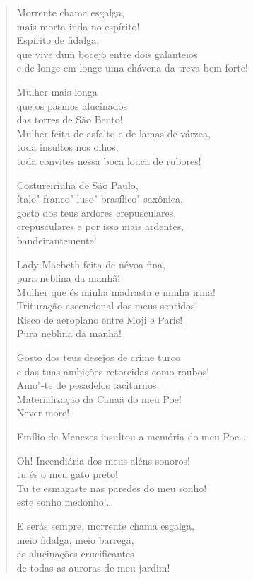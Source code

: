 \begin{verse}
Morrente chama esgalga,\\
mais morta inda no espírito!\\
Espírito de fidalga,\\
que vive dum bocejo entre dois galanteios\\
e de longe em longe uma chávena da treva bem forte!

Mulher mais longa\\
que os pasmos alucinados\\
das torres de São Bento!\\
Mulher feita de asfalto e de lamas de várzea,\\
toda insultos nos olhos,\\
toda convites nessa boca louca de rubores!

Costureirinha de São Paulo,\\
ítalo"-franco"-luso"-brasílico"-saxônica,\\
gosto dos teus ardores crepusculares,\\
crepusculares e por isso mais ardentes,\\
bandeirantemente!

Lady Macbeth feita de névoa fina,\\
pura neblina da manhã!\\
Mulher que és minha madrasta e minha irmã!\\
Trituração ascencional dos meus sentidos!\\
Risco de aeroplano entre Moji e Paris!\\
Pura neblina da manhã!

Gosto dos teus desejos de crime turco\\
e das tuas ambições retorcidas como roubos!\\
Amo"-te de pesadelos taciturnos,\\
Materialização da Canaã do meu Poe!\\
Never more!

Emílio de Menezes insultou a memória do meu Poe\ldots{}

Oh! Incendiária dos meus aléns sonoros!\\
tu és o meu gato preto!\\
Tu te esmagaste nas paredes do meu sonho!\\
este sonho medonho!\ldots{}

E serás sempre, morrente chama esgalga,\\
meio fidalga, meio barregã,\\
as alucinações crucificantes\\
de todas as auroras de meu jardim!
\end{verse}

